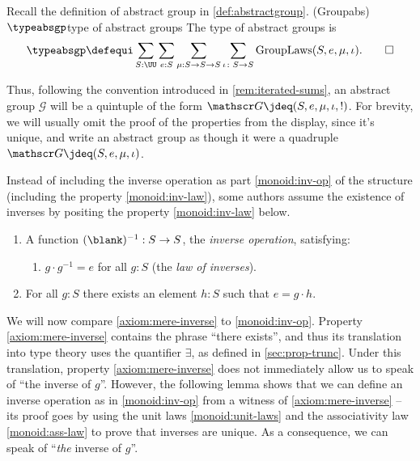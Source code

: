 \begin{definition}
  \label{def:type-abstrgp}
  Recall the definition of abstract group in \cref{def:abstractgroup}.
  \glossary(Groupabs){$\protect\typeabsgp$}{type of abstract groups}
  The type of abstract groups is
  \[
    \typeabsgp \defequi \sum_{S:\UU} \sum_{e:S}\sum_{\mu{}:S\to S\to S}
    \sum_{\iota\colon S\to S} \mathrm{GroupLaws}(S,e,\mu,\iota).\qedhere
  \]
\end{definition}

  Thus, following the convention introduced in \cref{rem:iterated-sums},
  an abstract group $\mathscr G$ will be a quintuple of the form
  $\mathscr G \jdeq (S,e,\mu,\iota,!)$.  For brevity, we will usually 
  omit the proof of the properties from the display, since it's unique,
  and write an abstract group as though it were a quadruple 
  $\mathscr G \jdeq (S,e,\mu,\iota)$.


\begin{remark}\label{rem:inverses-as-property}
  Instead of including the inverse operation as part
  \ref{monoid:inv-op} of the structure (including the property
  \ref{monoid:inv-law}), some authors assume the existence of inverses
  by positing the property \ref{monoid:inv-law} below.
  \begin{enumerate}[start=4]
    \item\label{monoid:inv-op} A function $(\blank)^{-1}:S\to S$, 
    the \emph{inverse operation}, satisfying:
    \begin{enumerate}[start=3,label=(\alph*),ref=\ref{monoid:inv-op} (\alph*),resume*]
    \item\label{monoid:inv-law} $g\cdot g^{-1} = e$ for all $g:S$ (the \emph{law of inverses}).
    \end{enumerate}
    \item\label{axiom:mere-inverse} For all $g:S$ there exists an element
    $h:S$ such that $e = g \cdot h$.
  \end{enumerate}

  We will now compare \ref{axiom:mere-inverse} to \ref{monoid:inv-op}.
  Property \ref{axiom:mere-inverse} contains the phrase ``there exists'', and thus its translation into type theory
  uses the quantifier $\exists$, as defined in \cref{sec:prop-trunc}.  Under this translation, property \ref{axiom:mere-inverse} does
  not immediately allow us to speak of ``the inverse of $g$''.
  However, the following lemma shows that we can define an inverse operation as in \ref{monoid:inv-op} from a witness of \ref{axiom:mere-inverse}
  -- its proof goes by using the unit laws \ref{monoid:unit-laws} and the
associativity law \ref{monoid:ass-law} to prove that inverses are unique.  
As a consequence, we can speak of ``\emph{the} inverse of $g$''.
\end{remark}


